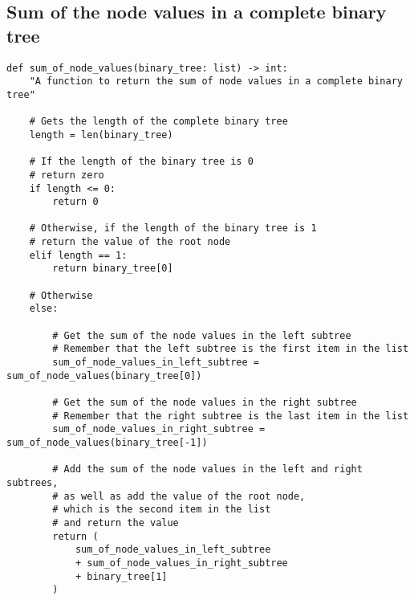 \documentclass[11pt]{article}
\begin{document}
 \newpage

\subsection{Sum of the node values in a complete binary tree}
\label{sec:org10100d1}
\begin{verbatim}
def sum_of_node_values(binary_tree: list) -> int:
    "A function to return the sum of node values in a complete binary tree"

    # Gets the length of the complete binary tree
    length = len(binary_tree)

    # If the length of the binary tree is 0
    # return zero
    if length <= 0:
        return 0

    # Otherwise, if the length of the binary tree is 1
    # return the value of the root node
    elif length == 1:
        return binary_tree[0]

    # Otherwise
    else:

        # Get the sum of the node values in the left subtree
        # Remember that the left subtree is the first item in the list
        sum_of_node_values_in_left_subtree = sum_of_node_values(binary_tree[0])

        # Get the sum of the node values in the right subtree
        # Remember that the right subtree is the last item in the list
        sum_of_node_values_in_right_subtree = sum_of_node_values(binary_tree[-1])

        # Add the sum of the node values in the left and right subtrees,
        # as well as add the value of the root node,
        # which is the second item in the list
        # and return the value
        return (
            sum_of_node_values_in_left_subtree
            + sum_of_node_values_in_right_subtree
            + binary_tree[1]
        )
\end{verbatim}

 \newpage
\end{document}
